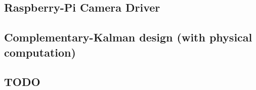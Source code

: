 \documentclass[ twoside, 12pt ]{article}
\newcommand{\commentOut}[1]{}
\begin{document}
\subsection{Raspberry-Pi Camera Driver}
\subsection{Complementary-Kalman design (with physical computation)}
\subsection{TODO}


\commentOut{
\section{Architecture: Automata Base Scheduler (From proposal)}

As describe in Section~\ref{sec:Problem} control systems have two main parts: \textit{state estimation} and \textit{controller}. 
The common used techniques for controllers, e.g PID, are relatively low resources consumers and there is no real justification of optimizing it, but this is not always the case for estimation process, some times there are heavy computational tasks as part of state estimation task, this refers to both the estimator and sensing stage.
The sensor can be complex computations of Global Positioning System (GPS) in small processor or even camera with heavy computer vision.
Those sensing task need to run in real-time and can interfere with rest of the system tasks.
In our architecture we concentrate more in those heavy sensing processes in order to improve the resource utilization and control performance.
(See~\ref{state estimation & why choose the window mission})

\commentOut{ %
    
}}
\end{document}
